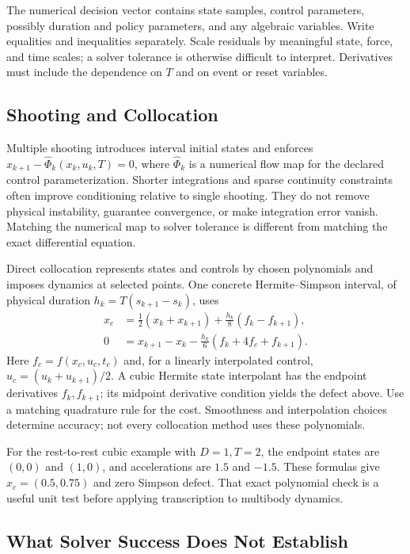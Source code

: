 The numerical decision vector contains state samples, control parameters,
possibly duration and policy parameters, and any algebraic variables. Write
equalities and inequalities separately. Scale residuals by meaningful state,
force, and time scales; a solver tolerance is otherwise difficult to interpret.
Derivatives must include the dependence on $T$ and on event or reset variables.

\subsection{Shooting and Collocation}

Multiple shooting introduces interval initial states and enforces
$x_{k+1}-\widehat\Phi_k(x_k,u_k,T)=0$, where $\widehat\Phi_k$ is a numerical
flow map for the declared control parameterization. Shorter integrations
and sparse continuity constraints often improve conditioning relative to
single shooting. They do not remove physical instability, guarantee convergence,
or make integration error vanish. Matching the numerical map to solver
tolerance is different from matching the exact differential equation.

Direct collocation represents states and controls by chosen polynomials
and imposes dynamics at selected points. One concrete Hermite--Simpson
interval, of physical duration $h_k=T(s_{k+1}-s_k)$, uses
\begin{equation}\label{eq:hermite_simpson}
 \begin{aligned}
 x_c&=\tfrac12(x_k+x_{k+1})+\tfrac{h_k}{8}(f_k-f_{k+1}),\\
 0&=x_{k+1}-x_k-\tfrac{h_k}{6}(f_k+4f_c+f_{k+1}).
 \end{aligned}
\end{equation}
Here $f_c=f(x_c,u_c,t_c)$ and, for a linearly interpolated control,
$u_c=(u_k+u_{k+1})/2$. A cubic Hermite state interpolant has the endpoint
derivatives $f_k,f_{k+1}$; its midpoint derivative condition yields the defect
above. Use a matching quadrature rule for the cost. Smoothness and interpolation
choices determine accuracy; not every collocation method uses these polynomials.

For the rest-to-rest cubic example with $D=1,T=2$, the endpoint states are
$(0,0)$ and $(1,0)$, and accelerations are $1.5$ and $-1.5$. These formulas
give $x_c=(0.5,0.75)$ and zero Simpson defect. That exact polynomial check
is a useful unit test before applying transcription to multibody dynamics.

\subsection{What Solver Success Does Not Establish}

